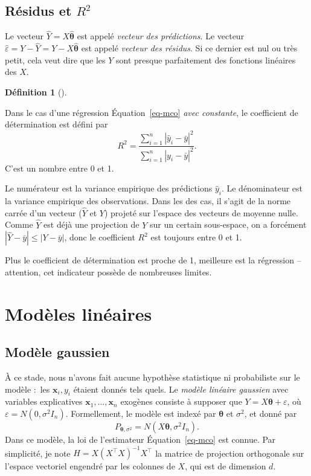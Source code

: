 \documentclass[
  10,
  letterpaper,
  DIV=11,
  numbers=noendperiod]{scrreport}
\newcommand{\bx}{\mathbf{x}}
\newcommand{\bt}{\boldsymbol{\theta}}
\theoremstyle{plain}
\theoremstyle{definition}
\theoremstyle{plain}
\theoremstyle{definition}
\newtheorem{definition}{Définition}[chapter]
\theoremstyle{definition}
\theoremstyle{plain}
\theoremstyle{remark}
\begin{document}
\hypertarget{ruxe9sidus-et-r2}{%
\section{\texorpdfstring{Résidus et
\(R^2\)}{Résidus et R\^{}2}}\label{ruxe9sidus-et-r2}}

Le vecteur \(\hat{Y} = X\hat{\bt}\) est appelé \emph{vecteur des
prédictions}. Le vecteur
\(\hat{\varepsilon} = Y-\hat{Y} = Y - X\hat{\bt}\) est appelé
\emph{vecteur des résidus}. Si ce dernier est nul ou très petit, cela
veut dire que les \(Y\) sont presque parfaitement des fonctions
linéaires des \(X\).

\begin{definition}[]\protect\hypertarget{def-rdeux}{}\label{def-rdeux}

Dans le cas d'une régression Équation~\ref{eq-mco} \emph{avec
constante}, le coefficient de détermination est défini par
\[R^2 = \frac{\sum_{i=1}^n |\hat{y}_i - \bar{y}|^2}{\sum_{i=1}^n |y_i - \bar{y}|^2}. \]
C'est un nombre entre 0 et 1.

\end{definition}

Le numérateur est la variance empirique des prédictions \(\hat{y}_i\).
Le dénominateur est la variance empirique des observations. Dans les des
cas, il s'agit de la norme carrée d'un vecteur (\(\hat{Y}\) et \(Y\))
projeté sur l'espace des vecteurs de moyenne nulle. Comme \(\hat{Y}\)
est déjà une projection de \(Y\) sur un certain sous-espace, on a
forcément \(|\hat{Y} - \bar{y}| \leqslant |Y - \bar{y}|\), donc le
coefficient \(R^2\) est toujours entre 0 et 1.

Plus le coefficient de détermination est proche de 1, meilleure est la
régression -- attention, cet indicateur possède de nombreuses limites.


\hypertarget{moduxe8les-linuxe9aires}{%
\chapter{Modèles linéaires}\label{moduxe8les-linuxe9aires}}

\hypertarget{sec-mlg}{%
\section{Modèle gaussien}\label{sec-mlg}}

À ce stade, nous n'avons fait aucune hypothèse statistique ni
probabiliste sur le modèle :~les \(\bx_i, y_i\) étaient donnés tels
quels. Le \emph{modèle linéaire gaussien} avec variables explicatives
\(\bx_1, \dotsc, \bx_n\) exogènes consiste à supposer que
\(Y = X\bt + \varepsilon\), où \(\varepsilon = N(0,\sigma^2 I_n)\).
Formellement, le modèle est indexé par \(\bt\) et \(\sigma^2\), et donné
par \[P_{\bt, \sigma^2} = N(X\bt, \sigma^2 I_n).\] Dans ce modèle, la
loi de l'estimateur Équation~\ref{eq-mco} est connue. Par simplicité, je
note \(H = X(X^\top X)^{-1}X^\top\) la matrice de projection orthogonale
sur l'espace vectoriel engendré par les colonnes de \(X\), qui est de
dimension \(d\).
\end{document}
